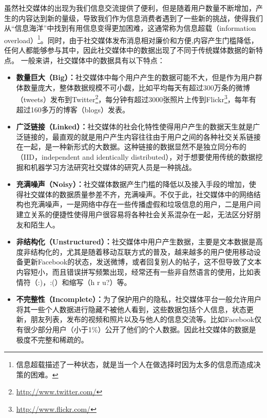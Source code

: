 虽然社交媒体的出现为我们信息交流提供了便利，但是随着用户数量不断增加，产生的内容达到新的量级，导致我们作为信息消费者遇到了一些新的挑战，使得我们从“信息海洋”中找到有用信息变得更加困难，这通常称为信息超载（information overload）\footnote{信息超载描述了一种状态，就是当一个人在做选择时因为太多的信息而造成决策的困难。}。同时，由于社交媒体发布消息相对廉价和方便,内容产生门槛降低，任何人都能够参与其中，因此社交媒体中的数据出现了不同于传统媒体数据的新特点。
一般来讲，社交媒体中的数据具有以下特点：
\begin{itemize}
\item \textbf{数量巨大（Big）：}社交媒体中每个用户产生的数据可能不大，但是作为用户群体数量庞大，整体数据规模不可小觑，比如平均每天有超过300万条的微博（tweets）发布到Twitter\footnote{\url{http://www.twitter.com/}}，每分钟有超过3000张照片上传到Flickr\footnote{\url{http://www.flickr.com/}}，每年有超过160多万的博客（blogs）发表。
\item \textbf{广泛链接（Linked）：}社交媒体的社会化特性使得用户产生的数据天生就是广泛链接的，最直观的就是用户产生内容往往由于用户之间的各种社交关系链接在一起，是一种新形式的大数据。这种链接的数据显然不是独立同分布的（IID，independent and identically distributed），对于想要使用传统的数据挖掘和机器学习方法研究社交媒体的研究人员是一种挑战。
\item \textbf{充满噪声（Noisy）：}社交媒体数据产生门槛的降低以及接入手段的增加，使得社交媒体的数据质量参差不齐，充满噪声。不仅于此，社交媒体中的网络结构也充满噪声，一是网络中存在一些传播虚假和垃圾信息的用户，二是用户间建立关系的便捷性使得用户很容易将各种社会关系混杂在一起，无法区分好朋友和陌生人。
\item \textbf{非结构化（Unstructured）：}社交媒体中用户产生数据，主要是文本数据是高度非结构化的，尤其是随着移动互联方式的普及，越来越多的用户使用移动设备更新Facebook的状态，发送微博，或者回复别人的帖子，这不但导致了文本内容短小，而且错误拼写频繁出现，经常还有一些非自然语言的使用，比如表情符（:)，:(）和缩写（h r u?）等。
\item \textbf{不完整性（Incomplete）：}为了保护用户的隐私，社交媒体平台一般允许用户将其一些个人数据进行隐藏不被他人看到，这些数据包括个人信息，状态更新，朋友列表，发布的视频和照片以及与他人的信息交流等。比如Facebook仅有很少部分用户（小于1\%）公开了他们的个人数据。因此社交媒体的数据是极度不完整和稀疏的。
\end{itemize}

